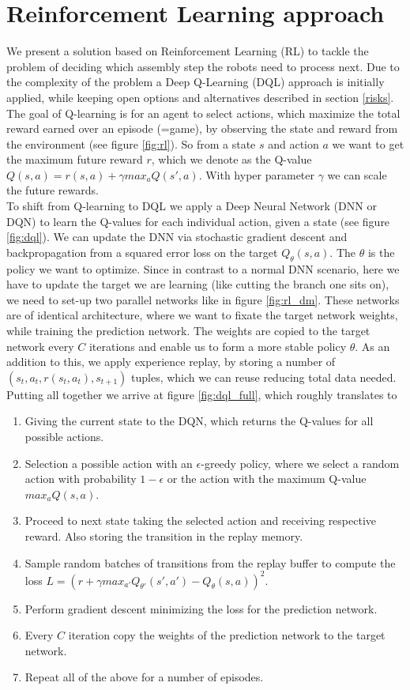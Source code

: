 \documentclass[runningheads,envcountsect]{llncs}
\begin{document}
\section{Reinforcement Learning approach}
We present a solution based on Reinforcement Learning (RL) to tackle the problem of deciding which assembly step the robots need to process next. Due to the complexity of the problem a Deep Q-Learning (DQL) approach is initially applied, while keeping open options and alternatives described in section \ref{risks}.\\
The goal of Q-learning is for an agent to select actions, which maximize the total reward earned over an episode (=game), by observing the state and reward from the environment (see figure \ref{fig:rl}). So from a state $s$ and action $a$ we want to get the maximum future reward $r$, which we denote as the Q-value $Q(s,a)=r(s,a)+\gamma max_a Q(s',a)$. With hyper parameter $\gamma$ we can scale the future rewards.\\
To shift from Q-learning to DQL we apply a Deep Neural Network (DNN or DQN) to learn the Q-values for each individual action, given a state (see figure \ref{fig:dql}). We can update the DNN via stochastic gradient descent and backpropagation from a squared error loss on the target $Q_\theta(s,a)$. The $\theta$ is the policy we want to optimize. Since in contrast to a normal DNN scenario, here we have to update the target we are learning (like cutting the branch one sits on), we need to set-up two parallel networks like in figure \ref{fig:rl_dm}. These networks are of identical architecture, where we want to fixate the target network weights, while training the prediction network. The weights are copied to the target network every $C$ iterations and enable us to form a more stable policy $\theta$. As an addition to this, we apply experience replay, by storing a number of $(s_t, a_t, r(s_t, a_t), s_{t+1})$ tuples, which we can reuse reducing total data needed.\\
Putting all together we arrive at figure \ref{fig:dql_full}, which roughly translates to
\begin{enumerate}
	\item Giving the current state to the DQN, which returns the Q-values for all possible actions.
	\item Selection a possible action with an $\epsilon$-greedy policy, where we select a random action with probability $1-\epsilon$ or the action with the maximum Q-value $max_a Q(s,a)$.
	\item Proceed to next state taking the selected action and receiving respective reward. Also storing the transition in the replay memory.
	\item Sample random batches of transitions from the replay buffer to compute the loss $L= (r + \gamma max_{a'} Q_{\theta'}(s', a') - Q_\theta(s, a))^2$.
	\item Perform gradient descent minimizing the loss for the prediction network.
	\item Every $C$ iteration copy the weights of the prediction network to the target network.
	\item Repeat all of the above for a number of episodes.
\end{enumerate}
\end{document}
